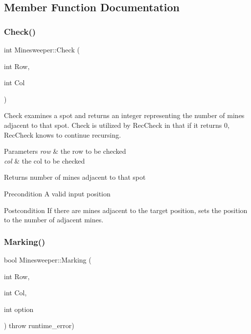 \subsection{Member Function Documentation}
\mbox{\label{classMinesweeper_a2c4f9e490db8fda6bef5cd5c532c49e5}} 
\subsubsection{\texorpdfstring{Check()}{Check()}}
{\footnotesize\ttfamily int Minesweeper\+::\+Check (\begin{DoxyParamCaption}\item[{int}]{Row,  }\item[{int}]{Col }\end{DoxyParamCaption})\hspace{0.3cm}{\ttfamily [private]}}

Check examines a spot and returns an integer representing the number of mines adjacent to that spot. Check is utilized by Rec\+Check in that if it returns 0, Rec\+Check knows to continue recursing. 
\begin{DoxyParams}{Parameters}
{\em row} & the row to be checked \\
\hline
{\em col} & the col to be checked \\
\hline
\end{DoxyParams}
\begin{DoxyReturn}{Returns}
number of mines adjacent to that spot 
\end{DoxyReturn}
\begin{DoxyPrecond}{Precondition}
A valid input position 
\end{DoxyPrecond}
\begin{DoxyPostcond}{Postcondition}
If there are mines adjacent to the target position, sets the position to the number of adjacent mines. 
\end{DoxyPostcond}
\mbox{\label{classMinesweeper_aa4de0f9fb93e5927bfbf1b2216f716ad}} 
\subsubsection{\texorpdfstring{Marking()}{Marking()}}
{\footnotesize\ttfamily bool Minesweeper\+::\+Marking (\begin{DoxyParamCaption}\item[{int}]{Row,  }\item[{int}]{Col,  }\item[{int}]{option }\end{DoxyParamCaption}) throw  runtime\+\_\+error) }



